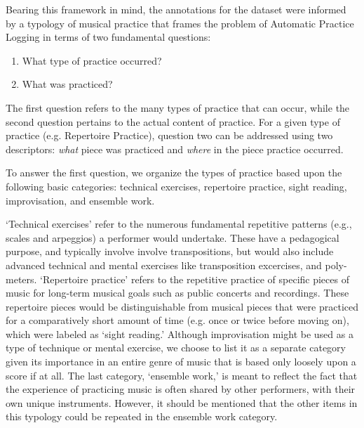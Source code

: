 \documentclass{article}
\begin{document}
Bearing this framework in mind, the annotations for the dataset were informed by a typology of musical practice that frames the problem of Automatic Practice Logging in terms of two fundamental questions:

\begin{enumerate}
\item What type of practice occurred?
\item What was practiced?
\end{enumerate}

The first question refers to the many types of practice that can occur, while the second question pertains to the actual content of practice. For a given type of practice (e.g. Repertoire Practice), question two can be addressed using two descriptors: \textit{what} piece was practiced and \textit{where} in the piece practice occurred.

To answer the first question, we organize the types of practice based upon the following basic categories: technical exercises, repertoire practice, sight reading, improvisation, and ensemble work.


`Technical exercises' refer to the numerous fundamental repetitive patterns (e.g., scales and arpeggios) a performer would undertake. These have a pedagogical purpose, and typically involve involve transpositions,  but would also include advanced technical and mental exercises like transposition excercises, and poly-meters.  `Repertoire practice' refers to the repetitive practice of specific pieces of music for long-term musical goals such as public concerts and recordings. These repertoire pieces would be distinguishable from musical pieces that were practiced for a comparatively short amount of time (e.g. once or twice before moving on), which were labeled as `sight reading.' Although improvisation might be used as a type of technique or mental exercise, we choose to list it as a separate category given its importance in an entire genre of music that is based only loosely upon a score if at all. 
The last category, `ensemble work,' is meant to reflect the fact that the experience of practicing music is often shared by other performers, with their own unique instruments.  However, it should be mentioned that the other items in this typology could be repeated in the ensemble work category.      
\end{document}
